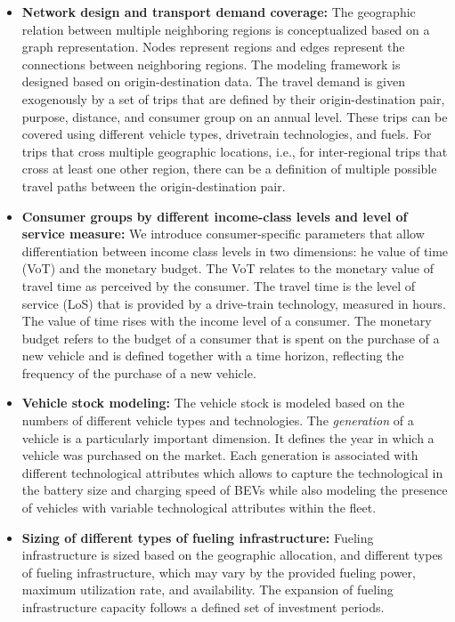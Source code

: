 \documentclass[preprint,review,11pt, authoryear]{elsarticle}
\begin{document}
    \begin{itemize}
        \item \textbf{Network design and transport demand coverage:} The geographic relation between multiple neighboring regions is conceptualized based on a graph representation. Nodes represent regions and edges represent the connections between neighboring regions. The modeling frame\deleted{ }work is designed based on origin-destination data. The travel demand is given exogenously by a set of trips that are defined by their origin-destination pair, purpose, distance, and consumer group on an annual level. These trips can be covered using different vehicle types, drive\deleted{-}train technologies, and fuels. For trips that cross multiple geographic locations, i.e., for inter-regional trips that cross at least one other region, there can be a definition of multiple possible travel paths between the origin-destination pair.

        \item \textbf{Consumer groups by different income-class levels and level of service measure:} We introduce consumer-specific parameters that allow differentiation between income class levels in two dimensions: he value of time (VoT) and the monetary budget. The VoT relates to the monetary value of travel time as perceived by the consumer. The travel time is the level of service (LoS) that is provided by a drive-train technology, measured in hours. The value of time rises with the income level of a consumer. The monetary budget refers to the budget of a consumer that is spent on the purchase of a new vehicle and is defined together with a time horizon, reflecting the frequency of the purchase of a new vehicle.
                
        \item \textbf{Vehicle stock modeling:} The vehicle stock is modeled based on the numbers of different vehicle types and technologies. The \textit{generation} of a vehicle is a particularly important dimension. It defines the year in which a vehicle was purchased on the market. Each generation is associated with different technological attributes which allows to capture the technological  in the battery size and charging speed of BEVs while also modeling the presence of vehicles with variable technological attributes within the fleet.

        \item \textbf{Sizing of different types of fueling infrastructure:} Fueling infrastructure is sized based on the geographic allocation, and different types of fueling infrastructure, which may vary by the provided fueling power, maximum utilization rate, and availability. The expansion of fueling infrastructure capacity follows a defined set of investment periods.


\end{itemize}
\end{document}
